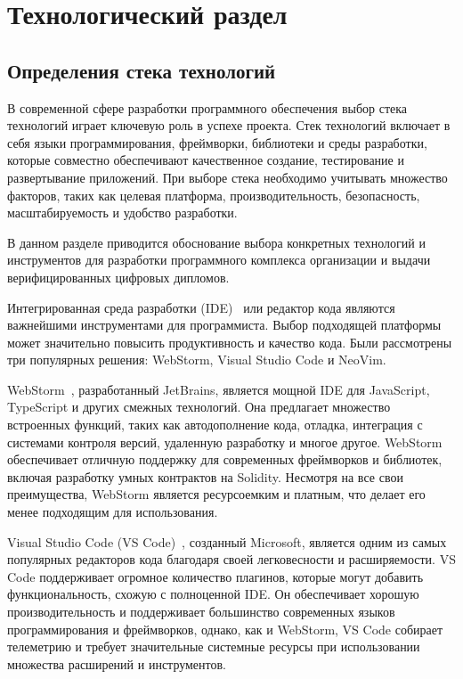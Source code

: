 \section{Технологический раздел}
\label{sec:technology}

\subsection{Определения стека технологий}

В современной сфере разработки программного обеспечения выбор стека технологий играет ключевую роль в успехе проекта. Стек технологий включает в себя языки программирования, фреймворки, библиотеки и среды разработки, которые совместно обеспечивают качественное создание, тестирование и развертывание приложений. При выборе стека необходимо учитывать множество факторов, таких как целевая платформа, производительность, безопасность, масштабируемость и удобство разработки.

В данном разделе приводится обоснование выбора конкретных технологий и инструментов для разработки программного комплекса организации и выдачи верифицированных цифровых дипломов.

Интегрированная среда разработки (IDE)~\cite{bib:ide_is} или редактор кода являются важнейшими инструментами для программиста. Выбор подходящей платформы может значительно повысить продуктивность и качество кода. Были рассмотрены три популярных решения: WebStorm, Visual Studio Code и NeoVim.

WebStorm~\cite{bib:webstorm}, разработанный JetBrains, является мощной IDE для JavaScript, TypeScript и других смежных технологий. Она предлагает множество встроенных функций, таких как автодополнение кода, отладка, интеграция с системами контроля версий, удаленную разработку и многое другое. WebStorm обеспечивает отличную поддержку для современных фреймворков и библиотек, включая разработку умных контрактов на Solidity. Несмотря на все свои преимущества, WebStorm является ресурсоемким и платным, что делает его менее подходящим для использования.

Visual Studio Code (VS Code)~\cite{bib:vscode}, созданный Microsoft, является одним из самых популярных редакторов кода благодаря своей легковесности и расширяемости. VS Code поддерживает огромное количество плагинов, которые могут добавить функциональность, схожую с полноценной IDE. Он обеспечивает хорошую производительность и поддерживает большинство современных языков программирования и фреймворков, однако, как и WebStorm, VS Code собирает телеметрию и требует значительные системные ресурсы при использовании множества расширений и инструментов.

